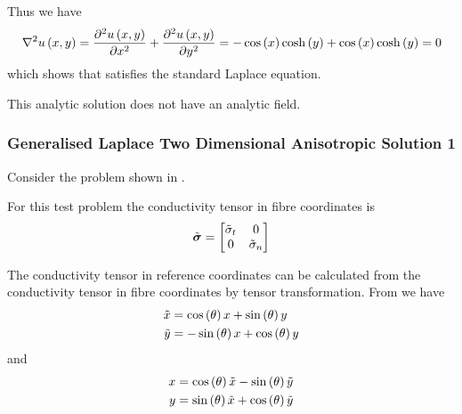 Thus we have
\begin{equation}
  \laplacian{}{\fnof{u}{x,y}}=\deltwosqby{\fnof{u}{x,y}}{x}+\deltwosqby{\fnof{u}{x,y}}{y}=-\cosine{x}\hypecosine{y}+
  \cosine{x}\hypecosine{y}=0
\end{equation}
which shows that  satisfies the standard Laplace equation.

This analytic solution does not have an analytic field.

\subsubsection{Generalised Laplace Two Dimensional Anisotropic Solution 1}

Consider the problem shown in .


For this test problem the conductivity tensor in fibre coordinates is
\begin{equation}
  \tilde{ \boldsymbol{\mathit{ \sigma }} }=\begin{bmatrix}
    \tilde{ \sigma }_{t} & 0 \\ 
    0 & \tilde{ \sigma }_{n}
  \end{bmatrix}
\end{equation}

The conductivity tensor in reference coordinates can be calculated
from the conductivity tensor in fibre coordinates by tensor
transformation. From  we have
\begin{equation}
  \begin{aligned}
    \tilde{x}&=\cosine{\theta}x+\sine{\theta}y\\
    \tilde{y}&=-\sine{\theta}x+\cosine{\theta}y
  \end{aligned}
  \label{eqn:AnisoPlateFibreFromSpatialCoordinates}
\end{equation}
and
\begin{equation}
  \begin{aligned}
    x&=\cosine{\theta}\tilde{x}-\sine{\theta}\tilde{y}\\
    y&=\sine{\theta}\tilde{x}+\cosine{\theta}\tilde{y}
  \end{aligned}
  \label{eqn:AnisoPlateSpatialFromFibreCoordinates}
\end{equation}

